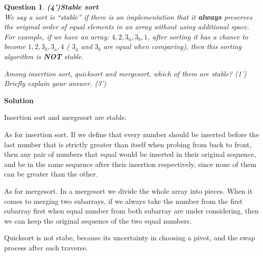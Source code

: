 \documentclass{article}
\newtheorem{Q}{Question}
\begin{document}
\begin{Q}\textbf{(4')Stable sort}\\
	We say a sort is ``stable'' if there is an implementation that it \textbf{always} preserves the original order of equal elements in an array without using additional space. For example, if we have an array: $4, 2, 3_a, 3_b, 1$, after sorting it has a chance to become $1, 2, 3_b, 3_a, 4$ ( $3_a$ and $3_b$ are equal when comparing), then this sorting algorithm is \textbf{NOT} stable.

	Among insertion sort, quicksort and mergesort, which of them are stable? (1') Briefly explain your answer. (3')
\end{Q}
\textbf{Solution}

Insertion sort and mergesort are stable.

As for insertion sort. If we define that every number should be inserted before the last number that is strictly greater than itself when probing from back to front,
then any pair of numbers that equal would be inserted in their original sequence, and be in the same sequence after their insertion respectively, since none of them can be greater than the other.

As for mergesort. In a mergesort we divide the whole array into pieces. When it comes to merging two subarrays, if we always take the number from the first subarray first when equal number
from both subarray are under considering, then we can keep the original sequence of the two equal numbers.

Quicksort is not stabe, because its uncertainty in choosing a pivot, and the swap process after each traverse.
\pagebreak
\end{document}
